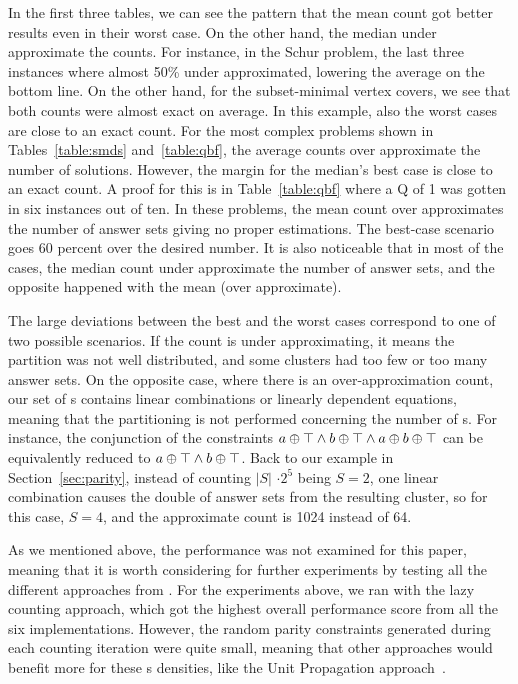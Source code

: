 In the first three tables, we can see the pattern that the mean count got better results even in their worst case.
On the other hand, the median under approximate the counts. For instance, in the Schur problem, the last three instances where almost 50\% under approximated, lowering the average on the bottom line.
%
On the other hand, for the subset-minimal vertex covers, we see that both counts were almost exact on average. In this example, also the worst cases are close to an exact count.
%
For the most complex problems shown in Tables~\ref{table:smds} and~\ref{table:qbf}, the average counts over approximate the number of solutions.
However, the margin for the median's best case is close to an exact count. A proof for this is in Table~\ref{table:qbf} where a Q of 1 was gotten in six instances out of ten.
In these problems, the mean count over approximates the number of answer sets giving no proper estimations. The best-case scenario goes 60 percent over the desired number.
%
It is also noticeable that in most of the cases, the median count under approximate the number of answer sets, and the opposite happened with the mean (over approximate).





The large deviations between the best and the worst cases correspond to one of two possible scenarios.
%
If the count is under approximating,
it means the partition was not well distributed, and some clusters had too few or too many answer sets. 
%
On the opposite case, where there is an over-approximation count,
our set of \XOR{}s contains linear combinations or linearly dependent equations,
meaning that the partitioning is not performed concerning the number of \XOR{}s.
% 
For instance, the conjunction of the \XOR{} constraints $a \oplus \top \land b \oplus \top \land a \oplus b \oplus \top$ can be equivalently reduced to $a \oplus \top \land b \oplus \top$. 
%
Back to our example in Section~\ref{sec:parity}, instead of counting $|S|$ $\cdot 2^5$ being $S=2$,
one linear combination causes the double of answer sets from the resulting cluster, so for this case, $S=4$, and the approximate count is 1024 instead of 64. 



As we mentioned above, the performance was not examined for this paper,
meaning that it is worth considering for further experiments by testing all the different approaches from \xorro{}.
For the experiments above, we ran \xorro{} with the lazy counting approach,
which got the highest overall performance score from all the six implementations.
However, the random parity constraints generated during each counting iteration were quite small,
meaning that other approaches would benefit more for these \XOR{}s densities, like the Unit Propagation approach~\cite{DBLP:conf/lpnmr/EverardoJKS19}.